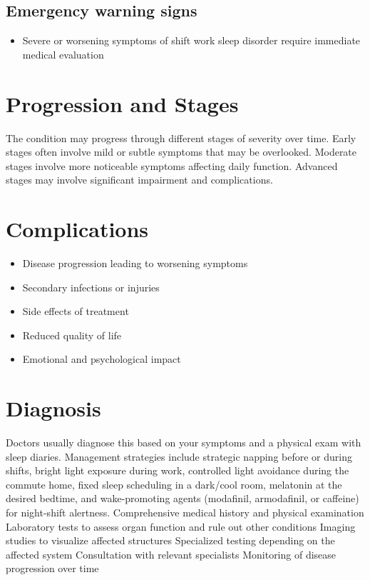 \subsection{Emergency warning signs}
\begin{itemize}[noitemsep]
  \item Severe or worsening symptoms of shift work sleep disorder require immediate medical evaluation
\end{itemize}
\section{Progression and Stages}
The condition may progress through different stages of severity over time. Early stages often involve mild or subtle symptoms that may be overlooked. Moderate stages involve more noticeable symptoms affecting daily function. Advanced stages may involve significant impairment and complications.
\section{Complications}
\begin{itemize}[noitemsep]
  \item Disease progression leading to worsening symptoms
  \item Secondary infections or injuries
  \item Side effects of treatment
  \item Reduced quality of life
  \item Emotional and psychological impact
\end{itemize}
\section{Diagnosis}
Doctors usually diagnose this based on your symptoms and a physical exam with sleep diaries. Management strategies include strategic napping before or during shifts, bright light exposure during work, controlled light avoidance during the commute home, fixed sleep scheduling in a dark/cool room, melatonin at the desired bedtime, and wake-promoting agents (modafinil, armodafinil, or caffeine) for night-shift alertness. Comprehensive medical history and physical examination Laboratory tests to assess organ function and rule out other conditions Imaging studies to visualize affected structures Specialized testing depending on the affected system Consultation with relevant specialists Monitoring of disease progression over time

